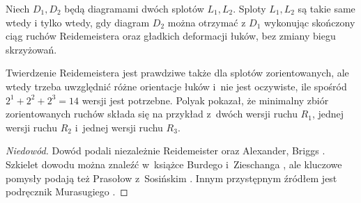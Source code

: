 \begin{theorem}[Reidemeister, 1927]
\label{thm:reidemeister}%
%
%
    Niech $D_1, D_2$ będą diagramami dwóch splotów $L_1, L_2$.
    Sploty $L_1, L_2$ są takie same wtedy i tylko wtedy, gdy diagram $D_2$ można otrzymać z $D_1$ wykonując skończony ciąg ruchów Reidemeistera oraz gładkich deformacji łuków, bez zmiany biegu skrzyżowań.
\end{theorem}

Twierdzenie Reidemeistera jest prawdziwe także dla splotów zorientowanych, ale wtedy trzeba uwzględnić różne orientacje łuków i~nie jest oczywiste, ile spośród $2^1 + 2^2 + 2^3 = 14$ wersji jest potrzebne.
Polyak \cite{polyak2010} pokazał, że minimalny zbiór zorientowanych ruchów składa się na przykład z~dwóch wersji ruchu $R_1$, jednej wersji ruchu $R_2$ i~jednej wersji ruchu $R_3$.
%

\begin{proof}[Niedowód]
Dowód podali niezależnie Reidemeister \cite{reidemeister1927} oraz Alexander, Briggs \cite{alexander1927}.
%
%
%
    Szkielet dowodu można znaleźć w~książce Burdego i~Zieschanga \cite[s. 9-11]{burde2014}, ale kluczowe pomysły podają też Prasołow z~Sosińskim \cite[s. 11-12]{prasolov1997}.
%
%
%
%
    Innym przystępnym źródłem jest podręcznik Murasugiego \cite[s. 50-56]{murasugi1996}.
%
\end{proof}

